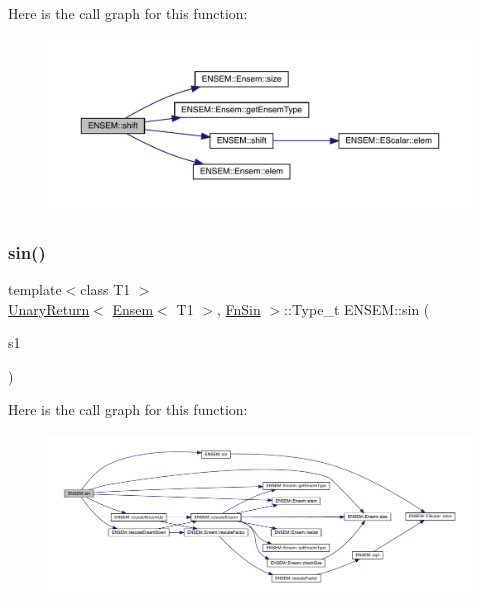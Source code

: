 Here is the call graph for this function\+:\nopagebreak
\begin{figure}[H]
\begin{center}
\leavevmode
\includegraphics[width=350pt]{d1/d9e/group__eensem_gab3a27539680d018ea7af80f7fe677576_cgraph}
\end{center}
\end{figure}
\mbox{\label{group__eensem_ga7c76c7e409f4cb0cb13cdb648ac99814}} 
\subsubsection{\texorpdfstring{sin()}{sin()}}
{\footnotesize\ttfamily template$<$class T1 $>$ \\
\mbox{\hyperlink{structENSEM_1_1UnaryReturn}{Unary\+Return}}$<$ \mbox{\hyperlink{classENSEM_1_1Ensem}{Ensem}}$<$ T1 $>$, \mbox{\hyperlink{structENSEM_1_1FnSin}{Fn\+Sin}} $>$\+::Type\+\_\+t E\+N\+S\+E\+M\+::sin (\begin{DoxyParamCaption}\item[{const \mbox{\hyperlink{classENSEM_1_1Ensem}{Ensem}}$<$ T1 $>$ \&}]{s1 }\end{DoxyParamCaption})\hspace{0.3cm}{\ttfamily [inline]}}

Here is the call graph for this function\+:\nopagebreak
\begin{figure}[H]
\begin{center}
\leavevmode
\includegraphics[width=350pt]{d1/d9e/group__eensem_ga7c76c7e409f4cb0cb13cdb648ac99814_cgraph}
\end{center}
\end{figure}
\mbox{\label{group__eensem_gac8bfa621e2dd6c732c311e9ffafb6eaf}} 
